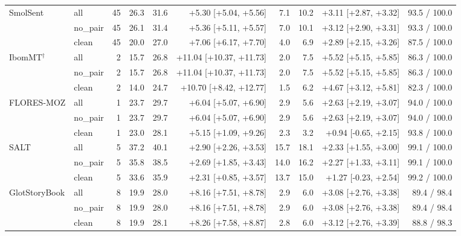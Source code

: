 \begin{table}[t]
\begin{adjustbox}{max width=\linewidth}
{\begin{tabular}{@{}llrrrrrrrr@{}}
SmolSent & all & 45 & 26.3 & 31.6 & +5.30 {[}+5.04, +5.56{]} & 7.1 & 10.2 & +3.11 {[}+2.87, +3.32{]} & 93.5 / 100.0 \\
& no\_pair & 45 & 26.1 & 31.4 & +5.36 {[}+5.11, +5.57{]} & 7.0 & 10.1 & +3.12 {[}+2.90, +3.31{]} & 93.3 / 100.0 \\
& clean & 45 & 20.0 & 27.0 & +7.06 {[}+6.17, +7.70{]} & 4.0 & 6.9 & +2.89 {[}+2.15, +3.26{]} & 87.5 / 100.0 \\
IbomMT\(^\dagger\) & all & 2 & 15.7 & 26.8 & +11.04 {[}+10.37, +11.73{]} & 2.0 & 7.5 & +5.52 {[}+5.15, +5.85{]} & 86.3 / 100.0 \\
& no\_pair & 2 & 15.7 & 26.8 & +11.04 {[}+10.37, +11.73{]} & 2.0 & 7.5 & +5.52 {[}+5.15, +5.85{]} & 86.3 / 100.0 \\
& clean & 2 & 14.0 & 24.7 & +10.70 {[}+8.42, +12.77{]} & 1.5 & 6.2 & +4.67 {[}+3.12, +5.81{]} & 82.3 / 100.0 \\
FLORES-MOZ & all & 1 & 23.7 & 29.7 & +6.04 {[}+5.07, +6.90{]} & 2.9 & 5.6 & +2.63 {[}+2.19, +3.07{]} & 94.0 / 100.0 \\
& no\_pair & 1 & 23.7 & 29.7 & +6.04 {[}+5.07, +6.90{]} & 2.9 & 5.6 & +2.63 {[}+2.19, +3.07{]} & 94.0 / 100.0 \\
& clean & 1 & 23.0 & 28.1 & +5.15 {[}+1.09, +9.26{]} & 2.3 & 3.2 & +0.94 {[}-0.65, +2.15{]} & 93.8 / 100.0 \\
SALT & all & 5 & 37.2 & 40.1 & +2.90 {[}+2.26, +3.53{]} & 15.7 & 18.1 & +2.33 {[}+1.55, +3.00{]} & 99.1 / 100.0 \\
& no\_pair & 5 & 35.8 & 38.5 & +2.69 {[}+1.85, +3.43{]} & 14.0 & 16.2 & +2.27 {[}+1.33, +3.11{]} & 99.1 / 100.0 \\
& clean & 5 & 33.6 & 35.9 & +2.31 {[}+0.85, +3.57{]} & 13.7 & 15.0 & +1.27 {[}-0.23, +2.54{]} & 99.2 / 100.0 \\
GlotStoryBook & all & 8 & 19.9 & 28.0 & +8.16 {[}+7.51, +8.78{]} & 2.9 & 6.0 & +3.08 {[}+2.76, +3.38{]} & 89.4 / 98.4 \\
& no\_pair & 8 & 19.9 & 28.0 & +8.16 {[}+7.51, +8.78{]} & 2.9 & 6.0 & +3.08 {[}+2.76, +3.38{]} & 89.4 / 98.4 \\
& clean & 8 & 19.9 & 28.1 & +8.26 {[}+7.58, +8.87{]} & 2.8 & 6.0 & +3.12 {[}+2.76, +3.39{]} & 88.8 / 98.3 \\
\bottomrule
\end{tabular}
}
\end{adjustbox}
\end{table}

